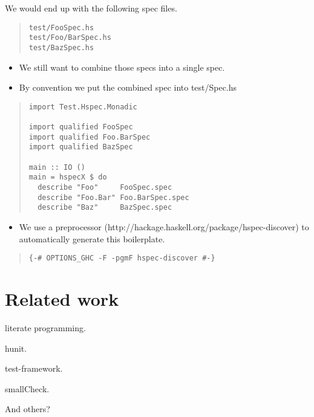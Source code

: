 \documentclass[preprint]{sigplanconf}
\begin{document}
\noindent We would end up with the following spec files.

\begin{quote}
\small
\begin{verbatim}
test/FooSpec.hs
test/Foo/BarSpec.hs
test/BazSpec.hs
\end{verbatim}
\end{quote}

\begin{itemize}
\item We still want to combine those specs into a single spec.
\item By convention we put the combined spec into test/Spec.hs
\end{itemize}

\begin{quote}
\small
\begin{verbatim}
import Test.Hspec.Monadic

import qualified FooSpec
import qualified Foo.BarSpec
import qualified BazSpec

main :: IO ()
main = hspecX $ do
  describe "Foo"     FooSpec.spec
  describe "Foo.Bar" Foo.BarSpec.spec
  describe "Baz"     BazSpec.spec
\end{verbatim}
\end{quote}

\begin{itemize}
\item We use a preprocessor (http://hackage.haskell.org/package/hspec-discover) to automatically generate this boilerplate.
\end{itemize}

\begin{quote}
\small
\begin{verbatim}
{-# OPTIONS_GHC -F -pgmF hspec-discover #-}
\end{verbatim}
\end{quote}

\section{Related work}

literate programming.

hunit.

test-framework.

smallCheck.

And others?

\end{document}
